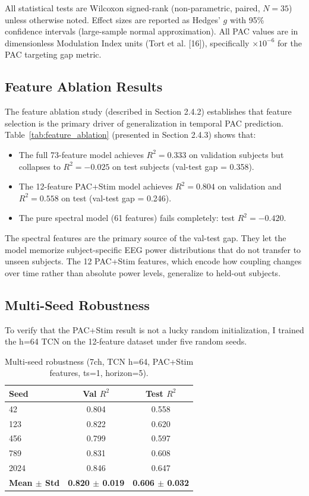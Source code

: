 \documentclass[11pt,letterpaper]{article}
\begin{document}
All statistical tests are Wilcoxon signed-rank (non-parametric, paired, $N = 35$) unless otherwise noted. Effect sizes are reported as Hedges' $g$ with 95\% confidence intervals (large-sample normal approximation). All PAC values are in dimensionless Modulation Index units (Tort et al. [16]), specifically $\times 10^{-6}$ for the PAC targeting gap metric.

\subsection{Feature Ablation Results}

The feature ablation study (described in Section 2.4.2) establishes that feature selection is the primary driver of generalization in temporal PAC prediction. Table~\ref{tab:feature_ablation} (presented in Section 2.4.3) shows that:

\begin{itemize}[nosep]
  \item The full 73-feature model achieves $R^2 = 0.333$ on validation subjects but collapses to $R^2 = -0.025$ on test subjects (val-test gap = 0.358).
  \item The 12-feature PAC+Stim model achieves $R^2 = 0.804$ on validation and $R^2 = 0.558$ on test (val-test gap = 0.246).
  \item The pure spectral model (61 features) fails completely: test $R^2 = -0.420$.
\end{itemize}

The spectral features are the primary source of the val-test gap. They let the model memorize subject-specific EEG power distributions that do not transfer to unseen subjects. The 12 PAC+Stim features, which encode how coupling changes over time rather than absolute power levels, generalize to held-out subjects.

\subsection{Multi-Seed Robustness}

To verify that the PAC+Stim result is not a lucky random initialization, I trained the h=64 TCN on the 12-feature dataset under five random seeds.

\begin{table}[htbp]
\centering
\caption{Multi-seed robustness (7ch, TCN h=64, PAC+Stim features, ts=1, horizon=5).}
\label{tab:multiseed}
\small
\begin{tabular}{lcc}
\toprule
\textbf{Seed} & \textbf{Val $R^2$} & \textbf{Test $R^2$} \\
\midrule
42 & 0.804 & 0.558 \\
123 & 0.822 & 0.620 \\
456 & 0.799 & 0.597 \\
789 & 0.831 & 0.608 \\
2024 & 0.846 & 0.647 \\
\midrule
\textbf{Mean $\pm$ Std} & \textbf{0.820 $\pm$ 0.019} & \textbf{0.606 $\pm$ 0.032} \\
\bottomrule
\end{tabular}
\end{table}
\end{document}
